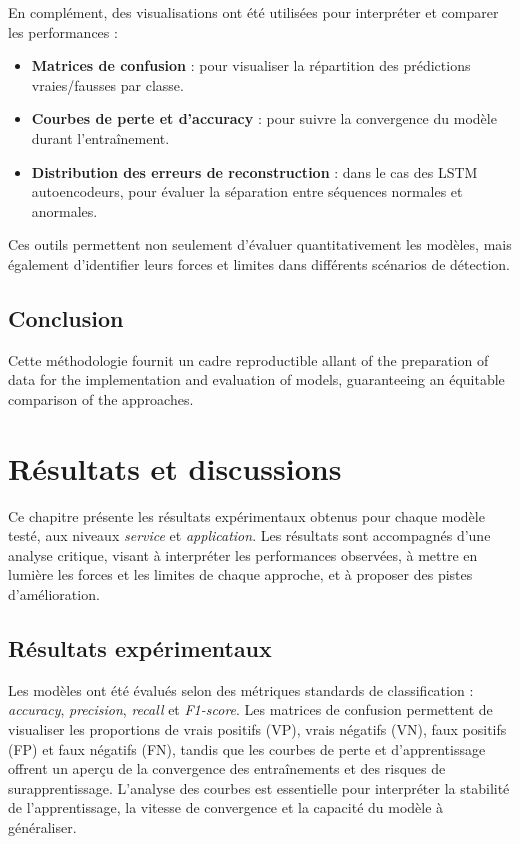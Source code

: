 \documentclass[a4paper,12pt]{report}
\begin{document}
En complément, des visualisations ont été utilisées pour interpréter et comparer les performances :
\begin{itemize}
    \item \textbf{Matrices de confusion} : pour visualiser la répartition des prédictions vraies/fausses par classe.
    \item \textbf{Courbes de perte et d’accuracy} : pour suivre la convergence du modèle durant l’entraînement.
    \item \textbf{Distribution des erreurs de reconstruction} : dans le cas des LSTM autoencodeurs, pour évaluer la séparation entre séquences normales et anormales.
\end{itemize}

Ces outils permettent non seulement d’évaluer quantitativement les modèles, mais également d’identifier leurs forces et limites dans différents scénarios de détection.


\section*{Conclusion}

Cette méthodologie fournit un cadre reproductible allant of the preparation of data for the implementation and evaluation of models, guaranteeing an équitable comparison of the approaches.



\chapter{Résultats et discussions}

Ce chapitre présente les résultats expérimentaux obtenus pour chaque modèle testé, aux niveaux \textit{service} et \textit{application}. Les résultats sont accompagnés d’une analyse critique, visant à interpréter les performances observées, à mettre en lumière les forces et les limites de chaque approche, et à proposer des pistes d’amélioration.

\section{Résultats expérimentaux}

Les modèles ont été évalués selon des métriques standards de classification : \textit{accuracy}, \textit{precision}, \textit{recall} et \textit{F1-score}. Les matrices de confusion permettent de visualiser les proportions de vrais positifs (VP), vrais négatifs (VN), faux positifs (FP) et faux négatifs (FN), tandis que les courbes de perte et d’apprentissage offrent un aperçu de la convergence des entraînements et des risques de surapprentissage. L'analyse des courbes est essentielle pour interpréter la stabilité de l'apprentissage, la vitesse de convergence et la capacité du modèle à généraliser.
\end{document}
